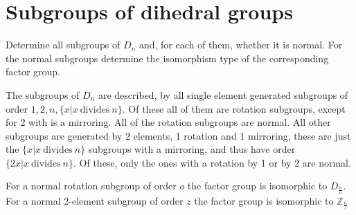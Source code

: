 \section{Subgroups of dihedral groups}

Determine all subgroups of $D_n$ and, for each of them, whether it is normal. For the normal subgroups determine the isomorphism type of the corresponding factor group.

The subgroups of $D_n$ are described, by all single element generated subgroups of order $1,2,n,\{x|x~\text{divides}~n\}$. Of these all of them are rotation subgroups, except for $2$ with is a mirroring. All of the rotation subgroups are normal. All other subgroups are generated by 2 elements, 1 rotation and 1 mirroring, these are just the $\{x|x~\text{divides}~n\}$ subgroups with a mirroring, and thus have order $\{2x|x~\text{divides}~n\}$. Of these, only the ones with a rotation by 1 or by 2 are normal.

For a normal rotation subgroup of order $o$ the factor group is isomorphic to $D_\frac{n}{o}$.
For a normal 2-element subgroup of order $z$ the factor group is isomorphic to $\mathbb Z_\frac{n}{z}$ 